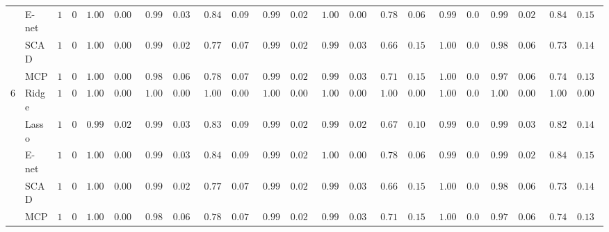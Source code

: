 \begin{tabular}{ll|ll|llllll|llllll|llllll}
 & E-net  & $1$ & $0$ & $1.000$ & $0.0000$ & $0.994$ & $0.0343$ & $0.844$ & $0.0925$ & $0.998$ & $0.0200$ & $1.000$ & $0.0000$ & $0.784$ & $0.0615$ & $0.998$ & $0.02$ & $0.998$ & $0.0200$ & $0.842$ & $0.1512$ \\
 & SCAD  & $1$ & $0$ & $1.000$ & $0.0000$ & $0.996$ & $0.0281$ & $0.774$ & $0.0787$ & $0.996$ & $0.0281$ & $0.994$ & $0.0343$ & $0.664$ & $0.1580$ & $1.000$ & $0.00$ & $0.980$ & $0.0603$ & $0.730$ & $0.1403$ \\
 & MCP  & $1$ & $0$ & $1.000$ & $0.0000$ & $0.980$ & $0.0603$ & $0.786$ & $0.0711$ & $0.996$ & $0.0281$ & $0.994$ & $0.0343$ & $0.714$ & $0.1511$ & $1.000$ & $0.00$ & $0.976$ & $0.0653$ & $0.746$ & $0.1359$ \\\hline
6 & Ridge  & $1$ & $0$ & $1.000$ & $0.0000$ & $1.000$ & $0.0000$ & $1.000$ & $0.0000$ & $1.000$ & $0.0000$ & $1.000$ & $0.0000$ & $1.000$ & $0.0000$ & $1.000$ & $0.00$ & $1.000$ & $0.0000$ & $1.000$ & $0.0000$ \\
 & Lasso  & $1$ & $0$ & $0.998$ & $0.0200$ & $0.994$ & $0.0343$ & $0.836$ & $0.0916$ & $0.998$ & $0.0200$ & $0.998$ & $0.0200$ & $0.670$ & $0.1000$ & $0.998$ & $0.02$ & $0.994$ & $0.0343$ & $0.826$ & $0.1440$ \\
 & E-net  & $1$ & $0$ & $1.000$ & $0.0000$ & $0.994$ & $0.0343$ & $0.844$ & $0.0925$ & $0.998$ & $0.0200$ & $1.000$ & $0.0000$ & $0.784$ & $0.0615$ & $0.998$ & $0.02$ & $0.998$ & $0.0200$ & $0.842$ & $0.1512$ \\
 & SCAD  & $1$ & $0$ & $1.000$ & $0.0000$ & $0.996$ & $0.0281$ & $0.774$ & $0.0787$ & $0.996$ & $0.0281$ & $0.994$ & $0.0343$ & $0.664$ & $0.1580$ & $1.000$ & $0.00$ & $0.980$ & $0.0603$ & $0.730$ & $0.1403$ \\
 & MCP  & $1$ & $0$ & $1.000$ & $0.0000$ & $0.980$ & $0.0603$ & $0.786$ & $0.0711$ & $0.996$ & $0.0281$ & $0.994$ & $0.0343$ & $0.714$ & $0.1511$ & $1.000$ & $0.00$ & $0.976$ & $0.0653$ & $0.746$ & $0.1359$ \\
\hline 
\end{tabular}

